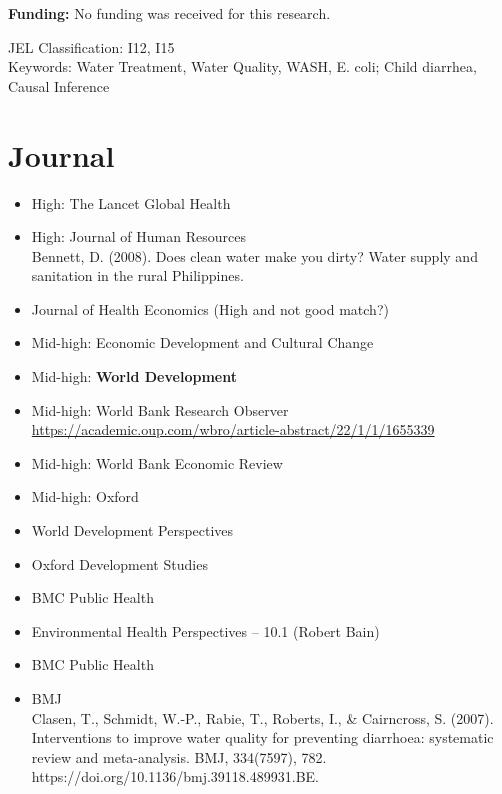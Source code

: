 \documentclass [11pt]{article}
\theoremstyle{plain}
\theoremstyle{definition}
\theoremstyle{remark}
\newcommand{\1}{\bm{1}}
\begin{document}
\doublespacing 

\noindent
\textbf{Funding:}
No funding was received for this research.

\noindent 
JEL Classification: I12, I15 \\
\noindent
Keywords: Water Treatment, Water Quality, WASH, E. coli; Child diarrhea, Causal Inference

\clearpage

\section*{Journal}
\begin{itemize}
	\item High: The Lancet Global Health
	\item High: Journal of Human Resources\\
	Bennett, D. (2008). Does clean water make you dirty? Water supply and sanitation in the rural Philippines.
	\item Journal of Health Economics (High and not good match?)
	\item Mid-high: Economic Development and Cultural Change
	\item Mid-high: \textbf{World Development}
	\item Mid-high: World Bank Research Observer\\
	\url{https://academic.oup.com/wbro/article-abstract/22/1/1/1655339}
	\item Mid-high: World Bank Economic Review
	\item Mid-high: Oxford
	\item World Development Perspectives
	\item Oxford Development Studies
	\item	BMC Public Health
	\item Environmental Health Perspectives – 10.1 (Robert Bain)
	\item BMC Public Health
	\item BMJ\\
Clasen, T., Schmidt, W.-P., Rabie, T., Roberts, I., \& Cairncross, S. (2007). Interventions to improve water quality for preventing diarrhoea: systematic review and meta-analysis. BMJ, 334(7597), 782. https://doi.org/10.1136/bmj.39118.489931.BE.
\end{itemize}
\end{document}
